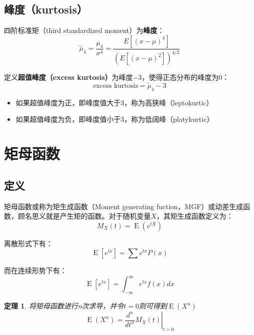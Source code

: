 \documentclass[11pt]{article}
\newcommand{\E}{\operatorname{E}}
\newtheorem{thm}{定理}[subsection]
\begin{document}
\subsection*{峰度（kurtosis）}
四阶标准矩（third standardized moment）为\textbf{峰度}：
\begin{equation*}
    \tilde{\mu}_4 = \frac{\mu_4}{\sigma^4} = \frac{E[(x-\mu)^4]}{\left(E[(x-\mu)^2]\right)^{4/2}} 
\end{equation*}

定义\textbf{超值峰度（excess kurtosis）}为峰度$-3$，使得正态分布的峰度为0：
\begin{equation*}
    \text{excess kurtosis} = \tilde{\mu}_4-3
\end{equation*}
\begin{itemize}
    \item 如果超值峰度为正，即峰度值大于3，称为高狭峰（leptokurtic）
    \item 如果超值峰度为负，即峰度值小于3，称为低阔峰（platykurtic）
\end{itemize}

\section{矩母函数}

\subsection{定义}

矩母函数或称为矩生成函数（Moment generating fuction，MGF）或动差生成函数，顾名思义就是产生矩的函数。对于随机变量$X$，其矩生成函数定义为：
\begin{equation*}
    \boxed{
        M_X(t) = \E(e^{tX})
    }
\end{equation*}

离散形式下有：
\begin{equation*}
    \E[e^{tx}] = \sum e^{tx} P(x)
\end{equation*}

而在连续形势下有：
\begin{equation*}
    \E[e^{tx}] = \int_{-\infty}^{\infty} e^{tx} f(x) dx
\end{equation*}

\begin{thm}
    将矩母函数进行n次求导，并令$t=0$则可得到$\E(X^n)$
    \begin{equation*}
        \E(X^n) = \left. \frac{d^n}{dt^n} M_X(t) \right\vert_{t=0}
    \end{equation*}
\end{thm}
\end{document}
